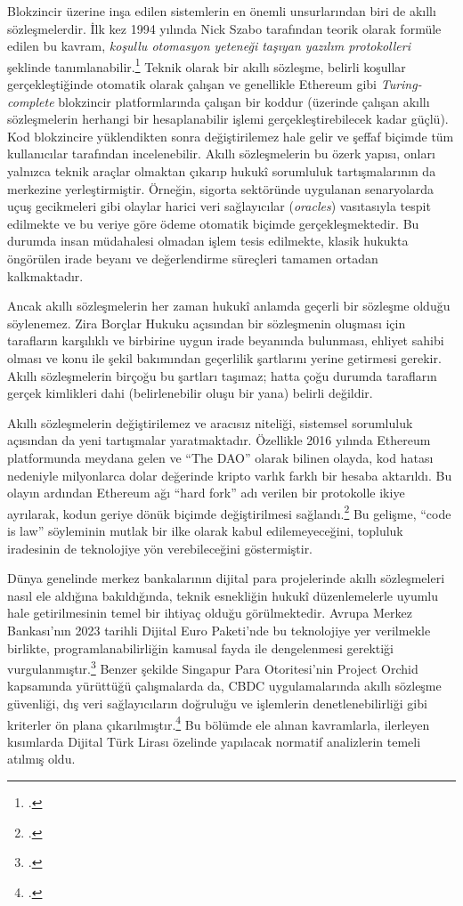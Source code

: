\documentclass[a4paper,12pt]{article}
\begin{document}
Blokzincir üzerine inşa edilen sistemlerin en önemli unsurlarından biri de akıllı sözleşmelerdir. İlk kez 1994 yılında Nick Szabo tarafından teorik olarak formüle edilen bu kavram, \textit{koşullu otomasyon yeteneği taşıyan yazılım protokolleri} şeklinde tanımlanabilir.\footcite{szabo1997formalizing} Teknik olarak bir akıllı sözleşme, belirli koşullar gerçekleştiğinde otomatik olarak çalışan ve genellikle Ethereum gibi \textit{Turing-complete} blokzincir platformlarında çalışan bir koddur (üzerinde çalışan akıllı sözleşmelerin herhangi bir hesaplanabilir işlemi gerçekleştirebilecek kadar güçlü). Kod blokzincire yüklendikten sonra değiştirilemez hale gelir ve şeffaf biçimde tüm kullanıcılar tarafından incelenebilir. Akıllı sözleşmelerin bu özerk yapısı, onları yalnızca teknik araçlar olmaktan çıkarıp hukukî sorumluluk tartışmalarının da merkezine yerleştirmiştir. Örneğin, sigorta sektöründe uygulanan senaryolarda uçuş gecikmeleri gibi olaylar harici veri sağlayıcılar (\textit{oracles}) vasıtasıyla tespit edilmekte ve bu veriye göre ödeme otomatik biçimde gerçekleşmektedir. Bu durumda insan müdahalesi olmadan işlem tesis edilmekte, klasik hukukta öngörülen irade beyanı ve değerlendirme süreçleri tamamen ortadan kalkmaktadır.

Ancak akıllı sözleşmelerin her zaman hukukî anlamda geçerli bir sözleşme olduğu söylenemez. Zira Borçlar Hukuku açısından bir sözleşmenin oluşması için tarafların karşılıklı ve birbirine uygun irade beyanında bulunması, ehliyet sahibi olması ve konu ile şekil bakımından geçerlilik şartlarını yerine getirmesi gerekir. Akıllı sözleşmelerin birçoğu bu şartları taşımaz; hatta çoğu durumda tarafların gerçek kimlikleri dahi (belirlenebilir oluşu bir yana) belirli değildir. 

Akıllı sözleşmelerin değiştirilemez ve aracısız niteliği, sistemsel sorumluluk açısından da yeni tartışmalar yaratmaktadır. Özellikle 2016 yılında Ethereum platformunda meydana gelen ve “The DAO” olarak bilinen olayda, kod hatası nedeniyle milyonlarca dolar değerinde kripto varlık farklı bir hesaba aktarıldı. Bu olayın ardından Ethereum ağı “hard fork” adı verilen bir protokolle ikiye ayrılarak, kodun geriye dönük biçimde değiştirilmesi sağlandı.\footcite{mehar2019dao} Bu gelişme, “code is law” söyleminin mutlak bir ilke olarak kabul edilemeyeceğini, topluluk iradesinin de teknolojiye yön verebileceğini göstermiştir.

Dünya genelinde merkez bankalarının dijital para projelerinde akıllı sözleşmeleri nasıl ele aldığına bakıldığında, teknik esnekliğin hukukî düzenlemelerle uyumlu hale getirilmesinin temel bir ihtiyaç olduğu görülmektedir. Avrupa Merkez Bankası’nın 2023 tarihli Dijital Euro Paketi’nde bu teknolojiye yer verilmekle birlikte, programlanabilirliğin kamusal fayda ile dengelenmesi gerektiği vurgulanmıştır.\footcite{ecb2023digital} Benzer şekilde Singapur Para Otoritesi’nin Project Orchid kapsamında yürüttüğü çalışmalarda da, CBDC uygulamalarında akıllı sözleşme güvenliği, dış veri sağlayıcıların doğruluğu ve işlemlerin denetlenebilirliği gibi kriterler ön plana çıkarılmıştır.\footcite{mas2023orchid} Bu bölümde ele alınan kavramlarla, ilerleyen kısımlarda Dijital Türk Lirası özelinde yapılacak normatif analizlerin temeli atılmış oldu.
\end{document}
